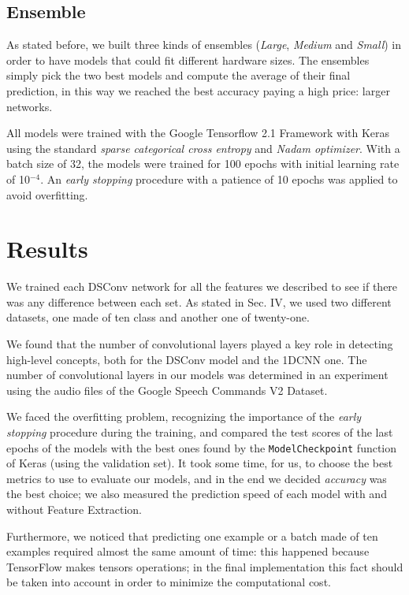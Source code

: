 \documentclass[conference]{IEEEtran}
\begin{document}
\subsection{Ensemble}
As stated before, we built three kinds of ensembles (\textit{Large}, \textit{Medium} and \textit{Small}) in order to have models that could fit different hardware sizes. The ensembles simply pick the two best models and compute the average of their final prediction, in this way we reached the best accuracy paying a high price: larger networks.

All models were trained with the Google Tensorflow 2.1 Framework with Keras using the standard \textit{sparse categorical cross entropy} and \textit{Nadam optimizer}. With a batch size of 32,
the models were trained for 100 epochs with initial learning rate of 10$^{-4}$. An \textit{early stopping} procedure with a patience of 10 epochs was applied to avoid overfitting.

\section{Results}
We trained each DSConv network for all the features we described to see if there was any difference between each set. As stated in Sec. IV, we used two different datasets, one made of ten class and another one of twenty-one.

We found that the number of convolutional layers played a key role in detecting high-level concepts, both for the DSConv model and the 1DCNN one. The number of convolutional layers in our models was determined in an experiment using the audio files of the Google Speech Commands V2 Dataset.

We faced the overfitting problem, recognizing the importance of the \textit{early stopping} procedure during the training, and compared the test scores of the last epochs of the models with the best ones found by the \texttt{ModelCheckpoint} function of Keras (using the validation set).
It took some time, for us, to choose the best metrics to use to evaluate our models, and in the end we decided \textit{accuracy} was the best choice; we also measured the prediction speed of each model with and without Feature Extraction. 

Furthermore, we noticed that predicting one example or a batch made of ten examples required almost the same amount of time: this happened because TensorFlow makes tensors operations; in the final implementation this fact should be taken into account in order to minimize the computational cost.
\end{document}

